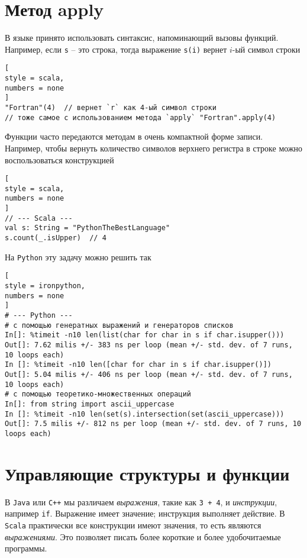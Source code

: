 \documentclass[%
	11pt,
	a4paper,
	utf8,
		]{article}
\begin{document}

\section{Метод apply}

В языке принято использовать синтаксис, напоминающий вызовы функций. Например, если \texttt{s} -- это строка, тогда выражение \texttt{s(i)} вернет $ i $-ый символ строки
\begin{lstlisting}[
style = scala,
numbers = none
]
"Fortran"(4)  // вернет `r` как 4-ый символ строки
// тоже самое с использованием метода `apply` "Fortran".apply(4)
\end{lstlisting}

Функции часто передаются методам в очень компактной форме записи. Например, чтобы вернуть количество символов верхнего регистра в строке можно воспользоваться конструкцией
\begin{lstlisting}[
style = scala,
numbers = none
]
// --- Scala ---
val s: String = "PythonTheBestLanguage"
s.count(_.isUpper)  // 4
\end{lstlisting}

На \texttt{Python} эту задачу можно решить так
\begin{lstlisting}[
style = ironpython,
numbers = none
]
# --- Python ---
# с помощью генератных выражений и генераторов списков
In[]: %timeit -n10 len(list(char for char in s if char.isupper()))
Out[]: 7.62 milis +/- 383 ns per loop (mean +/- std. dev. of 7 runs, 10 loops each)
In []: %timeit -n10 len([char for char in s if char.isupper()])
Out[]: 5.04 milis +/- 406 ns per loop (mean +/- std. dev. of 7 runs, 10 loops each)
# с помощью теоретико-множественных операций
In[]: from string import ascii_uppercase
In []: %timeit -n10 len(set(s).intersection(set(ascii_uppercase)))
Out[]: 7.5 milis +/- 812 ns per loop (mean +/- std. dev. of 7 runs, 10 loops each)
\end{lstlisting}

\section{Управляющие структуры и функции}

В \texttt{Java} или \texttt{C++} мы различаем \emph{выражения}, такие как \texttt{3 + 4}, и \emph{инструкции}, например \texttt{if}. Выражение имеет значение; инструкция выполняет действие. В \texttt{Scala} практически все конструкции имеют значения, то есть являются \emph{выражениями}. Это позволяет писать более короткие и более удобочитаемые программы.
\end{document}

